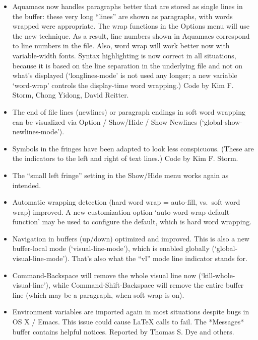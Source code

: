 \begin{itemize}

\item Aquamacs now handles paragraphs better that are stored as single lines in the buffer: these very long ``lines'' are shown as paragraphs, with words wrapped were appropriate.  The wrap functions in the Options menu will use the new technique.  As a result, line numbers shown in Aquamacs correspond to line numbers in the file.  Also, word wrap will work better now with variable-width fonts.  Syntax highlighting is now correct in all situations, because it is based on the line separation in the underlying file and not on what's displayed  (`longlines-mode' is not used any longer; a new variable `word-wrap' controls the display-time word wrapping.)
Code by Kim F. Storm, Chong Yidong, David Reitter.

\item The end of file lines (newlines) or paragraph endings in soft word wrapping can be visualized via Option / Show/Hide / Show Newlines (`global-show-newlines-mode').

\item Symbols in the fringes have been adapted to look less conspicuous. (These are the indicators to the left and right of text lines.)
Code by Kim F. Storm.

\item The ``small left fringe'' setting in the Show/Hide menu works again as intended.

\item Automatic wrapping detection (hard word wrap = auto-fill, vs.~soft word wrap) improved.  A new customization option `auto-word-wrap-default-function' may be used to configure the default, which is hard word wrapping.

\item Navigation in buffers (up/down) optimized and improved.  This is also a new buffer-local mode (`visual-line-mode'), which is enabled globally (`global-visual-line-mode').  That's also what the ``vl'' mode line indicator stands for.

\item Command-Backspace will remove the whole visual line now (`kill-whole-visual-line'), while Command-Shift-Backspace will remove the entire buffer line (which may be a paragraph, when soft wrap is on). 

\item Environment variables are imported again in most situations despite bugs in OS X / Emacs.  This issue could cause LaTeX calls to fail. The *Messages* buffer contains helpful notices. Reported by Thomas S. Dye and others.


\end{itemize}
